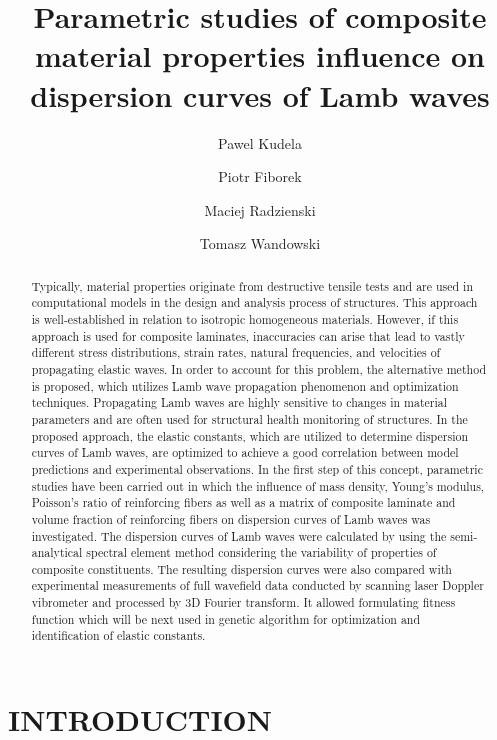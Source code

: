 \documentclass[]{spie}  %
\title{Parametric studies of composite material properties influence on dispersion curves of Lamb waves}
\author[a]{Pawel Kudela}
\author[a]{Piotr Fiborek}
\author[a]{Maciej Radzienski}
\author[a]{Tomasz Wandowski}
\affil[a]{Institute of Fluid-Flow Machinery, Polish Academy of Sciences, Fiszera 14 St, 80-231 Gdansk, Poland}
\begin{document}
 
\maketitle

\begin{abstract}
Typically, material properties originate from destructive tensile tests and are used in computational models in the design and analysis process of structures. 
This approach is well-established in relation to isotropic homogeneous materials. 
However, if this approach is used for composite laminates, inaccuracies can arise that lead to vastly different stress distributions, strain rates, natural frequencies, and velocities of propagating elastic waves. 
In order to account for this problem, the alternative method is proposed, which utilizes Lamb wave propagation phenomenon and optimization techniques. 
Propagating Lamb waves are highly sensitive to changes in material parameters and are often used for structural health monitoring of structures.
In the proposed approach, the elastic constants, which are utilized to determine dispersion curves of Lamb waves, are optimized to achieve a good correlation between model predictions and experimental observations. 
In the first step of this concept, parametric studies have been carried out in which the influence of mass density, Young's modulus, Poisson's ratio of reinforcing fibers as well as a matrix of composite laminate and volume fraction of reinforcing fibers on dispersion curves of Lamb waves was investigated. 
The dispersion curves of Lamb waves were calculated by using the semi-analytical spectral element method considering the variability of properties of composite constituents. 
The resulting dispersion curves were also compared with experimental measurements of full wavefield data conducted by scanning laser Doppler vibrometer and processed by 3D Fourier transform. It allowed formulating fitness function which will be next used in genetic algorithm for optimization and identification of elastic constants.
\end{abstract}


\section{INTRODUCTION}
\label{sec:intro}  %
\end{document}
